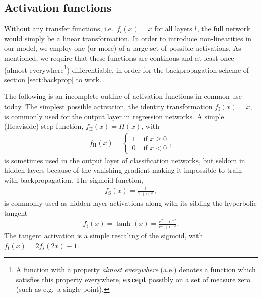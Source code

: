 \documentclass[a4paper, twocolumn]{article}
\begin{document}
\subsection{Activation functions \label{sect:activations}}
Without any transfer functions, i.e.\ $f_l(x)=x$ for all layers $l$, the full network would simply be a linear transformation. In order to introduce non-linearities in our model, we employ one (or more) of a large set of possible activations. As mentioned, we require that these functions are continous and at least once (almost everywhere\footnote{A function with a property \textit{almost everywhere} (a.e.) denotes a function which satisfies this property everywhere, \textbf{except} possibly on a set of measure zero (such as e.g.\ a single point).}) differentiable, in order for the backpropagation scheme of section \ref{sect:backprop} to work. 

The following is an incomplete outline of activation functions in common use today. The simplest possible activation, the identity transformation $f_\text{I}(x)=x$, is commonly used for the output layer in regression networks. A simple (Heaviside) step function, $f_\text{H}(x)=H(x)$, with 
\begin{align}
f_\text{H}(x)=
\begin{cases}
1 & \text{ if } x\ge0 \\
0 & \text{ if } x<0 
\end{cases},
\end{align}
is sometimes used in the output layer of classification networks, but seldom in hidden layers because of the vanishing gradient making it impossible to train with backpropagation. The sigmoid function, 
\begin{align}
f_\text{S}(x)=\frac{1}{1+\mathrm{e}^{-x}},
\end{align}
is commonly used as hidden layer activations along with its sibling the hyperbolic tangent
\begin{align}
f_\text{t}(x)=\tanh(x)=\frac{\mathrm{e}^{x}-\mathrm{e}^{-x}}{\mathrm{e}^{x}+\mathrm{e}^{-x}}.
\end{align}
The tangent activation is a simple rescaling of the sigmoid, with $f_\text{t}(x)=2f_\text{s}(2x)-1$.
\end{document}
